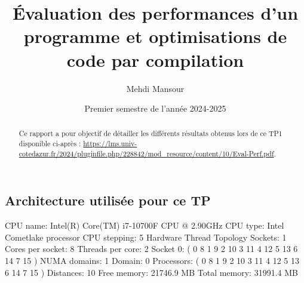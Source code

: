 \documentclass{rapport}
\title{Évaluation des performances d’un programme et optimisations de code par compilation}
\author{Mehdi Mansour}
\date{Premier semestre de l'année 2024-2025}
\begin{document}
  \maketitle

  \begin{abstract}
    Ce rapport a pour objectif de détailler les différents résultats obtenus lors de ce TP1 disponible ci-après : \url{https://lms.univ-cotedazur.fr/2024/pluginfile.php/228842/mod_resource/content/10/Eval-Perf.pdf}.
     \end{abstract}
\subsection*{Architecture utilisée pour ce TP}
     \noindent
    CPU name:	Intel(R) Core(TM) i7-10700F CPU @ 2.90GHz
    \newline
    CPU type:	Intel Cometlake processor
    \newline
    CPU stepping:	5
    \newline
    \newline
    \noindent
    Hardware Thread Topology
    \newline
    \newline
    Sockets:		1
    \newline
    Cores per socket:	8
    \newline
    Threads per core:	2
    \newline
    Socket 0:		( 0 8 1 9 2 10 3 11 4 12 5 13 6 14 7 15 )
    \newline
    \newline
    NUMA domains:		1
    \newline
    Domain:			0
    \newline
    Processors:		( 0 8 1 9 2 10 3 11 4 12 5 13 6 14 7 15 )
    \newline
    Distances:		10
    \newline
    Free memory:		21746.9 MB
    \newline
    Total memory:		31991.4 MB
    \newline
\end{document}
